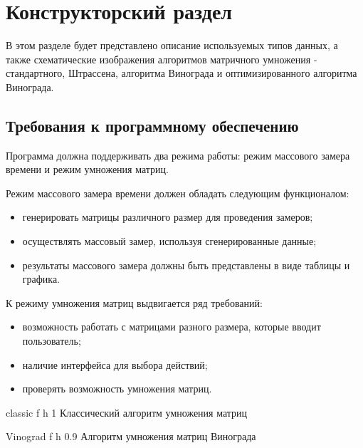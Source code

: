 \chapter{Конструкторский раздел}

В этом разделе будет представлено описание используемых типов данных, а также схематические изображения алгоритмов матричного умножения - стандартного, Штрассена, алгоритма Винограда и оптимизированного алгоритма Винограда.

\section{Требования к программному обеспечению}

Программа должна поддерживать два режима работы: режим массового замера времени и режим умножения матриц.

Режим массового замера времени должен обладать следующим функционалом:
\begin{itemize}
	\item генерировать матрицы различного размер для проведения замеров;
	\item осуществлять массовый замер, используя сгенерированные данные;
	\item результаты массового замера должны быть представлены в виде таблицы и графика.
\end{itemize}

К режиму умножения матриц выдвигается ряд требований:
\begin{itemize}
	\item возможность работать с матрицами разного размера, которые вводит пользователь;
	\item наличие интерфейса для выбора действий;
	\item проверять возможность умножения матриц.
\end{itemize}

{classic} %
{f} %
{h} %
{1\textwidth} %
{Классический алгоритм умножения матриц} %


{Vinograd} %
{f} %
{h} %
{0.9\textwidth} %
{Алгоритм умножения матриц Винограда} %
